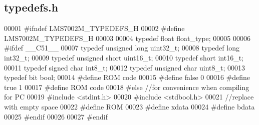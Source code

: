 \subsection{typedefs.\+h}
\label{typedefs_8h_source}

\begin{DoxyCode}
00001 \textcolor{preprocessor}{#ifndef LMS7002M\_TYPEDEFS\_H}
00002 \textcolor{preprocessor}{#define LMS7002M\_TYPEDEFS\_H}
00003 
00004 \textcolor{keyword}{typedef} \textcolor{keywordtype}{float} float_type;
00005 
00006 \textcolor{preprocessor}{#ifdef \_\_C51\_\_}
00007     \textcolor{keyword}{typedef} \textcolor{keywordtype}{unsigned} \textcolor{keywordtype}{long} uint32\_t;
00008     \textcolor{keyword}{typedef} \textcolor{keywordtype}{long} int32\_t;
00009     \textcolor{keyword}{typedef} \textcolor{keywordtype}{unsigned} \textcolor{keywordtype}{short} uint16\_t;
00010     \textcolor{keyword}{typedef} \textcolor{keywordtype}{short} int16\_t;
00011     \textcolor{keyword}{typedef} \textcolor{keywordtype}{signed} \textcolor{keywordtype}{char} int8\_t;
00012     \textcolor{keyword}{typedef} \textcolor{keywordtype}{unsigned} \textcolor{keywordtype}{char} uint8\_t;
00013     \textcolor{keyword}{typedef} bit bool;
00014 \textcolor{preprocessor}{    #define ROM code}
00015 \textcolor{preprocessor}{    #define false 0}
00016 \textcolor{preprocessor}{    #define true 1}
00017 \textcolor{preprocessor}{    #define ROM code}
00018 \textcolor{preprocessor}{#else //for convenience when compiling for PC}
00019 \textcolor{preprocessor}{    #include <stdint.h>}
00020 \textcolor{preprocessor}{    #include <stdbool.h>}
00021     \textcolor{comment}{//replace with empty space}
00022 \textcolor{preprocessor}{    #define ROM}
00023 \textcolor{preprocessor}{    #define xdata}
00024 \textcolor{preprocessor}{    #define bdata}
00025 \textcolor{preprocessor}{#endif}
00026 
00027 \textcolor{preprocessor}{#endif}
\end{DoxyCode}
